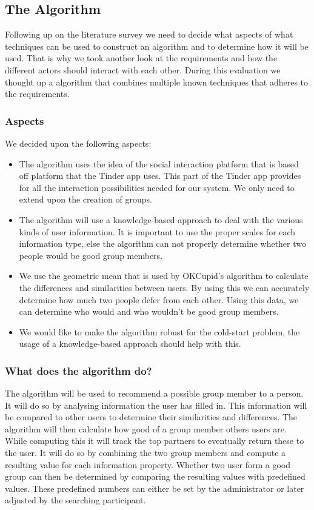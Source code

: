 \documentclass[]{article}
\begin{document}
\subsection{The Algorithm}
Following up on the literature survey we need to decide what aspects of what techniques can be used to construct an algorithm and to determine how it will be used.
That is why we took another look at the requirements and how the different actors should interact with each other.
During this evaluation we thought up a algorithm that combines multiple known techniques that adheres to the requirements.

\subsubsection{Aspects}
We decided upon the following aspects:
\begin{itemize}
\item The algorithm uses the idea of the social interaction platform that is based off platform that the Tinder app uses.
This part of the Tinder app provides for all the interaction possibilities needed for our system.
We only need to extend upon the creation of groups.
\item The algorithm will use a knowledge-based approach to deal with the various kinds of user information.
It is important to use the proper scales for each information type, else the algorithm can not properly determine whether two people would be good group members.
\item We use the geometric mean that is used by OKCupid's algorithm to calculate the differences and similarities between users.
By using this we can accurately determine how much two people defer from each other.
Using this data, we can determine who would and who wouldn't be good group members.
\item We would like to make the algorithm robust for the cold-start problem, the usage of a knowledge-based approach should help with this.
\end{itemize}

\subsubsection{What does the algorithm do?}
The algorithm will be used to recommend a possible group member to a person.
It will do so by analysing information the user has filled in.
This information will be compared to other users to determine their similarities and differences.
The algorithm will then calculate how good of a group member others users are.
While computing this it will track the top partners to eventually return these to the user.
It will do so by combining the two group members and compute a resulting value for each information property.
Whether two user form a good group can then be determined by comparing the resulting values with predefined values.
These predefined numbers can either be set by the administrator or later adjusted by the searching participant.
\end{document}
